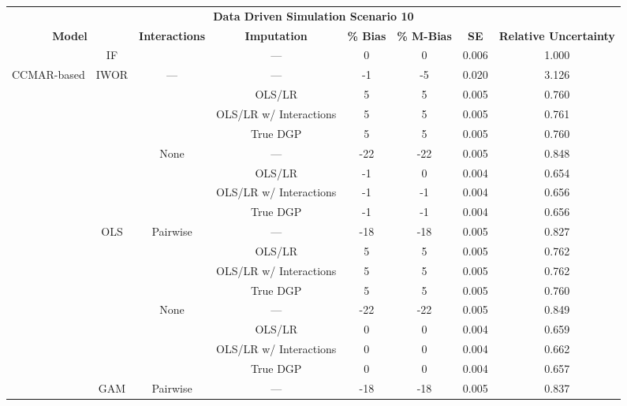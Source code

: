 \begin{table}
\centering
\begin{tabular}[ht]{|>{}c|c|c|c|c|c|c|>{}c|}
\hline
\multicolumn{8}{|c|}{\textbf{Data Driven Simulation Scenario 10}} \\
\cline{1-8}
\multicolumn{2}{|c|}{\textbf{Model}} & \textbf{Interactions} & \textbf{Imputation} & \textbf{\% Bias} & \textbf{\% M-Bias} & \textbf{SE} & \textbf{Relative Uncertainty}\\
\hline
 & IF &  & --- & 0 & 0 & 0.006 & 1.000\\
\cline{2-2}
\cline{4-8}
\multirow{-2}{*}{\centering\arraybackslash CCMAR-based} & IWOR & \multirow{-2}{*}{\centering\arraybackslash ---} & --- & -1 & -5 & 0.020 & 3.126\\
\cline{1-8}
 &  &  & OLS/LR & 5 & 5 & 0.005 & 0.760\\
\cline{4-8}
 &  &  & OLS/LR w/ Interactions & 5 & 5 & 0.005 & 0.761\\
\cline{4-8}
 &  &  & True DGP & 5 & 5 & 0.005 & 0.760\\
\cline{4-8}
 &  & \multirow{-4}{*}{\centering\arraybackslash None} & --- & -22 & -22 & 0.005 & 0.848\\
\cline{3-8}
 &  &  & OLS/LR & -1 & 0 & 0.004 & 0.654\\
\cline{4-8}
 &  &  & OLS/LR w/ Interactions & -1 & -1 & 0.004 & 0.656\\
\cline{4-8}
 &  &  & True DGP & -1 & -1 & 0.004 & 0.656\\
\cline{4-8}
 & \multirow{-8}{*}{\centering\arraybackslash OLS} & \multirow{-4}{*}{\centering\arraybackslash Pairwise} & --- & -18 & -18 & 0.005 & 0.827\\
\cline{2-8}
 &  &  & OLS/LR & 5 & 5 & 0.005 & 0.762\\
\cline{4-8}
 &  &  & OLS/LR w/ Interactions & 5 & 5 & 0.005 & 0.762\\
\cline{4-8}
 &  &  & True DGP & 5 & 5 & 0.005 & 0.760\\
\cline{4-8}
 &  & \multirow{-4}{*}{\centering\arraybackslash None} & --- & -22 & -22 & 0.005 & 0.849\\
\cline{3-8}
 &  &  & OLS/LR & 0 & 0 & 0.004 & 0.659\\
\cline{4-8}
 &  &  & OLS/LR w/ Interactions & 0 & 0 & 0.004 & 0.662\\
\cline{4-8}
 &  &  & True DGP & 0 & 0 & 0.004 & 0.657\\
\cline{4-8}
 & \multirow{-8}{*}{\centering\arraybackslash GAM} & \multirow{-4}{*}{\centering\arraybackslash Pairwise} & --- & -18 & -18 & 0.005 & 0.837\\

\end{tabular}
\end{table}
